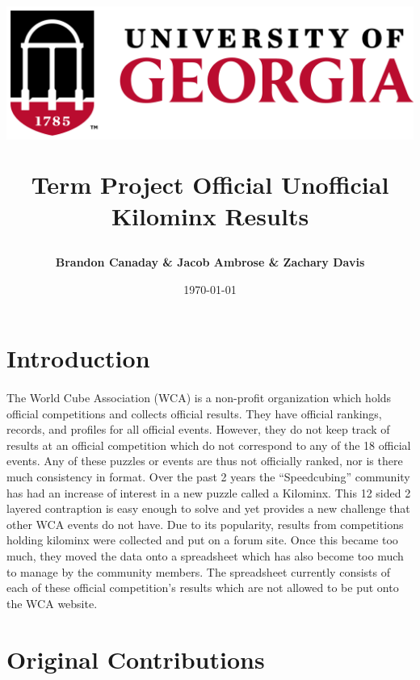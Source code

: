 \documentclass[12pt]{article}
\title{
	\begin{center}
		\includegraphics[scale=0.5]{uga.png}\\
 	\end{center}
 	Term Project
	\bigbreak Official Unofficial Kilominx Results
}
\author{\textbf{Brandon Canaday \& Jacob Ambrose \& Zachary Davis}}
\date{\today}
\begin{document}
	
	\vspace{\fill}
	\maketitle
	\vspace{\fill}

	\newpage
	\tableofcontents
	\newpage

	\section{Introduction}
		\paragraph*{}
			The World Cube Association (WCA) is a non-profit organization which holds official competitions and collects official results. They have official rankings, records, and profiles for all official events. However, they do not keep track of results at an official competition which do not correspond to any of the 18 official events. Any of these puzzles or events are thus not officially ranked, nor is there much consistency in format. Over the past 2 years the “Speedcubing” community has had an increase of interest in a new puzzle called a Kilominx. This 12 sided 2 layered contraption is easy enough to solve and yet provides a new challenge that other WCA events do not have. Due to its popularity, results from competitions holding kilominx were collected and put on a forum site. Once this became too much, they moved the data onto a spreadsheet which has also become too much to manage by the community members. The spreadsheet currently consists of each of these official competition’s results which are not allowed to be put onto the WCA website.

	\section{Original Contributions}
\end{document}
